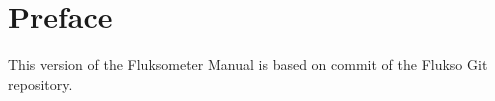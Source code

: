 \chapter{Preface}

This version of the Fluksometer Manual is based on commit \href{\URL}{\COMMIT} of the Flukso Git repository.
